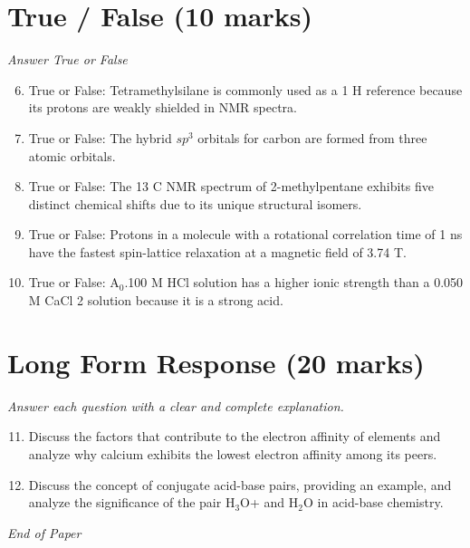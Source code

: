 \documentclass[12pt]{article}
\begin{document}
\section*{True / False (10 marks)}
\textit{Answer True or False}
\begin{enumerate}[label=\arabic*.]
\setcounter{enumi}{5}
\item True or False: Tetramethylsilane is commonly used as a 1 H reference because its protons are weakly shielded in NMR spectra.
\item True or False: The hybrid $sp^3$ orbitals for carbon are formed from three atomic orbitals.
\item True or False: The 13 C NMR spectrum of 2-methylpentane exhibits five distinct chemical shifts due to its unique structural isomers.
\item True or False: Protons in a molecule with a rotational correlation time of 1 ns have the fastest spin-lattice relaxation at a magnetic field of 3.74 T.
\item True or False: A$_{0}$.100 M HCl solution has a higher ionic strength than a 0.050 M CaCl 2 solution because it is a strong acid.
\end{enumerate}

\section*{Long Form Response (20 marks)}
\textit{Answer each question with a clear and complete explanation.}
\begin{enumerate}[label=\arabic*.]
\setcounter{enumi}{10}
\item Discuss the factors that contribute to the electron affinity of elements and analyze why calcium exhibits the lowest electron affinity among its peers.
\item Discuss the concept of conjugate acid-base pairs, providing an example, and analyze the significance of the pair H$_{3}$O+ and H$_{2}$O in acid-base chemistry.
\end{enumerate}

\vfill
\noindent\textit{End of Paper}
\end{document}
